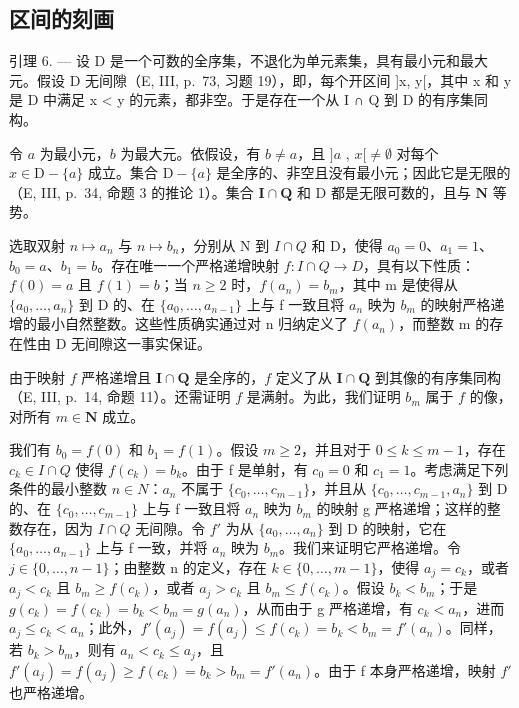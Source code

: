 \subsection{区间的刻画}

引理 6. --- 设 D 是一个可数的全序集，不退化为单元素集，具有最小元和最大元。假设 D 无间隙（E, III, p.~73, 习题 19），即，每个开区间 {]}x, y{[}，其中 x 和 y 是 D 中满足 x \textless{} y 的元素，都非空。于是存在一个从 I ∩ Q 到 D 的有序集同构。

令 \(a\) 为最小元，\(b\) 为最大元。依假设，有 \(b \neq a\)，且 \(]a\) , \(x[\neq \emptyset\) 对每个 \(x \in \mathrm{D} - \{a\}\) 成立。集合 \(\mathrm{D} - \{a\}\) 是全序的、非空且没有最小元；因此它是无限的（E, III, p.~34, 命题 3 的推论 1）。集合 \(\mathbf{I} \cap \mathbf{Q}\) 和 D 都是无限可数的，且与 \(\mathbf{N}\) 等势。

选取双射 \(n \mapsto a_{n}\) 与 \(n \mapsto b_{n}\)，分别从 N 到 \(I \cap Q\) 和 D，使得 \(a_{0} = 0\)、\(a_{1} = 1\)、\(b_{0} = a\)、\(b_{1} = b\)。存在唯一一个严格递增映射 \(f: I \cap Q \to D\)，具有以下性质：\(f(0) = a\) 且 \(f(1) = b\)；当 \(n \geqslant 2\) 时，\(f(a_{n}) = b_{m}\)，其中 m 是使得从 \(\{a_{0}, \ldots, a_{n}\}\) 到 D 的、在 \(\{a_{0}, \ldots, a_{n-1}\}\) 上与 f 一致且将 \(a_{n}\) 映为 \(b_{m}\) 的映射严格递增的最小自然整数。这些性质确实通过对 n 归纳定义了 \(f(a_{n})\)，而整数 m 的存在性由 D 无间隙这一事实保证。

由于映射 \(f\) 严格递增且 \(\mathbf{I} \cap \mathbf{Q}\) 是全序的，\(f\) 定义了从 \(\mathbf{I} \cap \mathbf{Q}\) 到其像的有序集同构（E, III, p.~14, 命题 11）。还需证明 \(f\) 是满射。为此，我们证明 \(b_{m}\) 属于 \(f\) 的像，对所有 \(m \in \mathbf{N}\) 成立。

我们有 \(b_{0}=f(0)\) 和 \(b_{1}=f(1)\)。假设 \(m\geqslant2\)，并且对于 \(0\leqslant k\leqslant m-1\)，存在 \(c_{k}\in I\cap Q\) 使得 \(f(c_{k})=b_{k}\)。由于 f 是单射，有 \(c_{0}=0\) 和 \(c_{1}=1\)。考虑满足下列条件的最小整数 \(n\in N\)：\(a_{n}\) 不属于 \(\{c_{0},\ldots,c_{m-1}\}\)，并且从 \(\{c_{0},\ldots,c_{m-1},a_{n}\}\) 到 D 的、在 \(\{c_{0},\ldots,c_{m-1}\}\) 上与 f 一致且将 \(a_{n}\) 映为 \(b_{m}\) 的映射 g 严格递增；这样的整数存在，因为 \(I\cap Q\) 无间隙。令 \(f'\) 为从 \(\{a_{0},\ldots,a_{n}\}\) 到 D 的映射，它在 \(\{a_{0},\ldots,a_{n-1}\}\) 上与 f 一致，并将 \(a_{n}\) 映为 \(b_{m}\)。我们来证明它严格递增。令 \(j\in\{0,\ldots,n-1\}\)；由整数 n 的定义，存在 \(k\in\{0,\ldots,m-1\}\)，使得 \(a_{j}=c_{k}\)，或者 \(a_{j}<c_{k}\) 且 \(b_{m}\geqslant f(c_{k})\)，或者 \(a_{j}>c_{k}\) 且 \(b_{m}\leqslant f(c_{k})\)。假设 \(b_{k}<b_{m}\)；于是 \(g(c_{k})=f(c_{k})=b_{k}<b_{m}=g(a_{n})\)，从而由于 g 严格递增，有 \(c_{k}<a_{n}\)，进而 \(a_{j}\leqslant c_{k}<a_{n}\)；此外，\(f'(a_{j})=f(a_{j})\leqslant f(c_{k})=b_{k}<b_{m}=f'(a_{n})\)。同样，若 \(b_{k}>b_{m}\)，则有 \(a_{n}<c_{k}\leqslant a_{j}\)，且 \(f'(a_{j})=f(a_{j})\geqslant f(c_{k})=b_{k}>b_{m}=f'(a_{n})\)。由于 f 本身严格递增，映射 \(f'\) 也严格递增。

